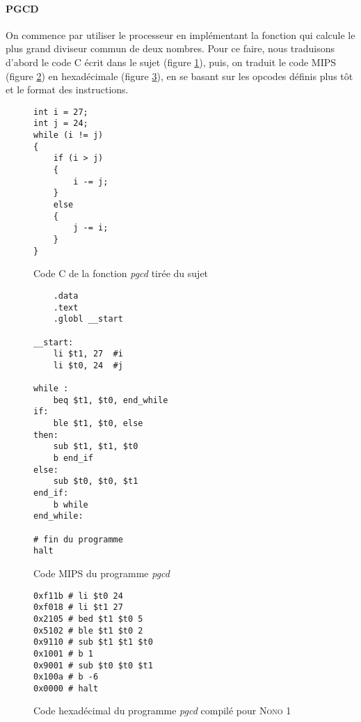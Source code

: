 \paragraph{PGCD}{
	On commence par utiliser le processeur en implémentant la fonction qui
	calcule le plus grand diviseur commun de deux nombres.
	Pour ce faire, nous traduisons d'abord le code C écrit dans le sujet
	(figure \ref{pgcd_c}), puis, on traduit le code MIPS (figure 
	\ref{pgcd_asm}) en hexadécimale (figure \ref{pgcd_hexa}), en se 
	basant sur les opcodes définis plus tôt et le format des instructions.
}

\begin{figure}
	\lstset{
		frame=single,
		numbers=left,
		numbersep=5pt,
		language=C++
	}
	\begin{lstlisting}
int i = 27;
int j = 24;
while (i != j)
{
	if (i > j)
	{
		i -= j;
	}
 	else
 	{
		j -= i;
	}
}
	\end{lstlisting}
	\caption{
		\label{pgcd_c}
		Code C de la fonction \textit{pgcd} tirée du sujet
	}
\end{figure}

\begin{figure}
	\begin{lstlisting}
	.data
	.text
	.globl __start
	
__start:
	li $t1, 27	#i
	li $t0, 24	#j
	
while :
	beq $t1, $t0, end_while
if:
	ble $t1, $t0, else
then:
	sub $t1, $t1, $t0
	b end_if
else:
	sub $t0, $t0, $t1
end_if:
	b while
end_while:

# fin du programme
halt

	\end{lstlisting}
	\caption{
		\label{pgcd_asm}
		Code MIPS du programme \textit{pgcd}
	}
\end{figure}

\begin{figure}
	\lstset{
		frame=single,
		numbers=left,
		numbersep=5pt,
		language=[mips]Assembler
	}
	\begin{lstlisting}
0xf11b # li $t0 24
0xf018 # li $t1 27
0x2105 # bed $t1 $t0 5
0x5102 # ble $t1 $t0 2
0x9110 # sub $t1 $t1 $t0
0x1001 # b 1
0x9001 # sub $t0 $t0 $t1
0x100a # b -6
0x0000 # halt
	\end{lstlisting}
	\caption{
		\label{pgcd_hexa}
		Code hexadécimal du programme \textit{pgcd} compilé pour \textsc{Nono 1}
	}
\end{figure}

